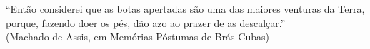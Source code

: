 \newpage
\thispagestyle{empty}

\vspace*{18cm}

\begin{flushright}
 ``Então considerei que as botas apertadas são uma das maiores venturas da Terra,\\
 porque, fazendo doer os pés, dão azo ao prazer de as descalçar.” \\
 (Machado de Assis, em Memórias Póstumas de Brás Cubas) \\
\end{flushright}
